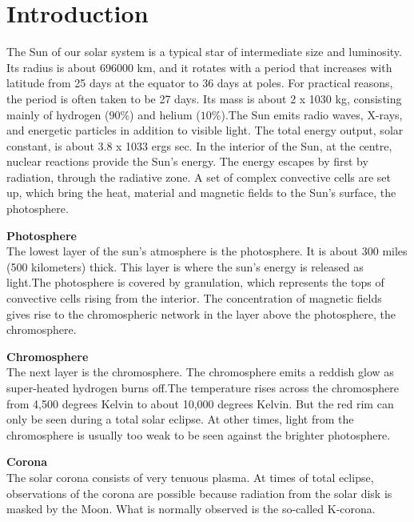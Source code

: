 \documentclass[journal]{IEEEtran}
\begin{document}
%
\IEEEpeerreviewmaketitle



\section{Introduction}
The Sun of our solar system is a typical star of intermediate size and luminosity. Its
radius is about 696000 km, and it rotates with a period that increases with latitude from
25 days at the equator to 36 days at poles. For practical reasons, the period is often
taken to be 27 days. Its mass is about 2 x 1030 kg, consisting mainly of hydrogen ($90 \% $)
and helium ($10 \% $).The Sun emits radio waves, X-rays, and energetic particles in addition to visible light. The total energy output, solar constant, is about 3.8 x 1033 ergs sec. In the interior of the Sun, at the centre, nuclear reactions provide the Sun's energy. The energy escapes by first by radiation, through the radiative zone. A set of complex convective cells are set up, which bring the heat, material and magnetic fields to the Sun's surface, the photosphere.

\textbf{Photosphere} \\ 
The lowest layer of the sun's atmosphere is the photosphere. It is about 300 miles (500
kilometers) thick. This layer is where the sun's energy is released as light.The
photosphere is covered by granulation, which represents the tops of convective cells
rising from the interior. The concentration of magnetic fields gives rise to the
chromospheric network in the layer above the photosphere, the chromosphere.

\textbf{Chromosphere} \\  
The next layer is the chromosphere. The chromosphere emits a reddish glow as
super-heated hydrogen burns off.The temperature rises across the chromosphere from
4,500 degrees Kelvin to about 10,000 degrees Kelvin. But the red rim can only be seen
during a total solar eclipse. At other times, light from the chromosphere is usually too
weak to be seen against the brighter photosphere.

\textbf{Corona} \\  
The solar corona consists of very tenuous plasma. At times of total eclipse,
observations of the corona are possible because radiation from the solar disk is masked
by the Moon. What is normally observed is the so-called K-corona.
\end{document}
